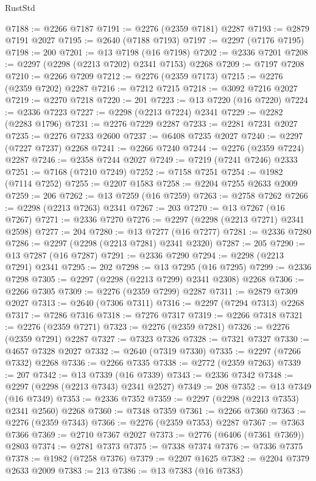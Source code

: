 \begin{lexlean}{RustStd}
\begin{coremodule}
@7188 := @2266 @7187
@7191 := @2276 (@2359 @7181) @2287
@7193 := @2879 @7191 @2027
@7195 := @2640 (@7188 @7193)
@7197 := @2297 (@7176 @7195)
@7198 := 200
@7201 := @13 @7198 (@16 @7198)
@7202 := @2336 @7201
@7208 := @2297 (@2298 (@2213 @7202) @2341 @7153) @2268
@7209 := @7197 @7208
@7210 := @2266 @7209
@7212 := @2276 (@2359 @7173)
@7215 := @2276 (@2359 @7202) @2287
@7216 := @7212 @7215
@7218 := @3092 @7216 @2027
@7219 := @2270 @7218
@7220 := 201
@7223 := @13 @7220 (@16 @7220)
@7224 := @2336 @7223
@7227 := @2298 (@2213 @7224) @2341
@7229 := @2282 (@2283 @1796)
@7231 := @2276 @7229 @2287
@7233 := @2281 @7231 @2027
@7235 := @2276 @7233 @2600
@7237 := @6408 @7235 @2027
@7240 := @2297 (@7227 @7237) @2268
@7241 := @2266 @7240
@7244 := @2276 (@2359 @7224) @2287
@7246 := @2358 @7244 @2027
@7249 := @7219 (@7241 @7246) @2333
@7251 := @7168 (@7210 @7249)
@7252 := @7158 @7251
@7254 := @1982 (@7114 @7252)
@7255 := @2207 @1583
@7258 := @2204 @7255 @2633 @2009
@7259 := 206
@7262 := @13 @7259 (@16 @7259)
@7263 := @2758 @7262
@7266 := @2298 (@2213 @7263) @2341
@7267 := 203
@7270 := @13 @7267 (@16 @7267)
@7271 := @2336 @7270
@7276 := @2297 (@2298 (@2213 @7271) @2341 @2598)
@7277 := 204
@7280 := @13 @7277 (@16 @7277)
@7281 := @2336 @7280
@7286 := @2297 (@2298 (@2213 @7281) @2341 @2320)
@7287 := 205
@7290 := @13 @7287 (@16 @7287)
@7291 := @2336 @7290
@7294 := @2298 (@2213 @7291) @2341
@7295 := 202
@7298 := @13 @7295 (@16 @7295)
@7299 := @2336 @7298
@7305 := @2297 (@2298 (@2213 @7299) @2341 @2308) @2268
@7306 := @2266 @7305
@7309 := @2276 (@2359 @7299) @2287
@7311 := @2879 @7309 @2027
@7313 := @2640 (@7306 @7311)
@7316 := @2297 (@7294 @7313) @2268
@7317 := @7286 @7316
@7318 := @7276 @7317
@7319 := @2266 @7318
@7321 := @2276 (@2359 @7271)
@7323 := @2276 (@2359 @7281)
@7326 := @2276 (@2359 @7291) @2287
@7327 := @7323 @7326
@7328 := @7321 @7327
@7330 := @4657 @7328 @2027
@7332 := @2640 (@7319 @7330)
@7335 := @2297 (@7266 @7332) @2268
@7336 := @2266 @7335
@7338 := @2772 (@2359 @7263)
@7339 := 207
@7342 := @13 @7339 (@16 @7339)
@7343 := @2336 @7342
@7348 := @2297 (@2298 (@2213 @7343) @2341 @2527)
@7349 := 208
@7352 := @13 @7349 (@16 @7349)
@7353 := @2336 @7352
@7359 := @2297 (@2298 (@2213 @7353) @2341 @2560) @2268
@7360 := @7348 @7359
@7361 := @2266 @7360
@7363 := @2276 (@2359 @7343)
@7366 := @2276 (@2359 @7353) @2287
@7367 := @7363 @7366
@7369 := @2710 @7367 @2027
@7373 := @2776 (@6406 (@7361 @7369)) @2803
@7374 := @2781 @7373
@7375 := @7338 @7374
@7376 := @7336 @7375
@7378 := @1982 (@7258 @7376)
@7379 := @2207 @1625
@7382 := @2204 @7379 @2633 @2009
@7383 := 213
@7386 := @13 @7383 (@16 @7383)

\end{coremodule}
\end{lexlean}
